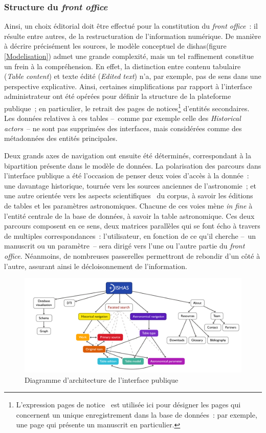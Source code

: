 \documentclass[a4paper,12pt,twoside]{book}
\newcommand{\eng}{\emph}
\newcommand{\bdd}{base de données\xspace}
\newcommand{\g}[1]{\og#1~\fg}
\newcommand{\dishas}{\gls{dishas}\xspace}
\begin{document}
			\subsubsection{Structure du \eng{front office}}
Ainsi, un choix éditorial doit être effectué pour la constitution du \eng{front office}~: il résulte entre autres, de la restructuration de l'information numérique. De manière à décrire précisément les sources, le modèle conceptuel de \dishas (figure \ref{Modelisation}) admet une grande complexité, mais un tel raffinement constitue un frein à la compréhension. En effet, la distinction entre contenu tabulaire (\eng{Table content}) et texte édité (\eng{Edited text}) n'a, par exemple, pas de sens dans une perspective explicative. Ainsi, certaines simplifications par rapport à l'interface administrateur ont été opérées pour définir la structure de la plateforme publique~; en particulier, le retrait des pages de notices\footnote{L'expression \g{pages de notice} est utilisée ici pour désigner les pages qui concernent un unique enregistrement dans la \bdd~: par exemple, une page qui présente un manuscrit en particulier.} d'entités secondaires. Les données relatives à ces tables –~comme par exemple celle des \eng{Historical actors}~–  ne sont pas supprimées des interfaces, mais considérées comme des métadonnées des entités principales.

Deux grands axes de navigation ont ensuite été déterminés, correspondant à la bipartition présente dans le modèle de données. La polarisation des parcours dans l'interface publique a été l'occasion de penser deux voies d'accès à la donnée~: une davantage historique, tournée vers les sources anciennes de l'astronomie~; et une autre orientée vers les aspects \g{scientifiques} du corpus, à savoir les éditions de tables et les paramètres astronomiques. Chacune de ces voies mène \eng{in fine} à l'entité centrale de la \bdd, à savoir la table astronomique. Ces deux parcours composent en ce sens, deux matrices parallèles qui se font écho à travers de multiples correspondances~: l'utilisateur, en fonction de ce qu'il cherche –~un manuscrit ou un paramètre~– sera dirigé vers l'une ou l'autre partie du \eng{front office}. Néanmoins, de nombreuses passerelles permettront de rebondir d'un côté à l'autre, assurant ainsi le décloisonnement de l'information.

\begin{figure}[h!]
	\centering
	\includegraphics[width=17cm]{Images/Plan-frontoffice.png}
	\caption{Diagramme d'architecture de l'interface publique}
\end{figure}
\end{document}
